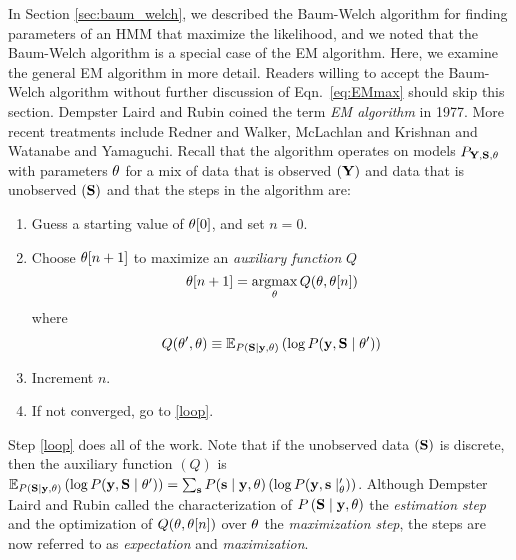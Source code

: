 In Section \ref{sec:baum_welch}, we described the Baum-Welch algorithm
for finding parameters of an HMM that maximize the likelihood, and we
noted that the Baum-Welch algorithm is a special case of the EM
algorithm.  Here, we examine the general EM algorithm in more detail.
Readers willing to accept the Baum-Welch algorithm without further
discussion of Eqn.~\ref{eq:EMmax} should skip this section.  Dempster
Laird and Rubin\cite{Dempster77} coined the term \emph{EM algorithm}
in 1977.  More recent treatments include Redner and
Walker\cite{Redner84}, McLachlan and Krishnan\cite{McLachlan96} and
Watanabe and Yamaguchi\cite{Watanabe04}.  
%
Recall that the algorithm operates on models $P_{{\bf Y},{\bf S},\theta} $
with parameters $\theta$ for a mix of data that is observed
$({\bf Y})$ and data that is unobserved $({\bf S})$ and that the steps in the
algorithm are:
\begin{enumerate}
\item Guess a starting value of ${\theta}{[0]}$, and set $n=0$.
\item \label{loop} Choose ${\theta}{[n+1]}$ to maximize
  an \emph{auxiliary function} $Q$
  \begin{equation}
    \label{eq:EMmax2}
    {\theta}{[n+1]} = \operatorname*{argmax}_{\theta} Q(\theta,
    {\theta}{[n]})
  \end{equation}
  where
  \begin{equation}
    \label{eq:Qdef2}
    Q(\theta',\theta) \equiv \mathbb{E}_{P\left({\bf S}\mid \mathbf{y}, \theta \right)}
    \left( \log P(\mathbf{y},{\bf S}\mid \theta') \right)
  \end{equation}
\item Increment $n$.
\item If not converged, go to \ref{loop}.
\end{enumerate}
Step \ref{loop} does all of the work.  Note that if the unobserved
data $({\bf S})$ is discrete, then the auxiliary function $(Q)$ is
$\mathbb{E}_{P\left({\bf S}\mid \mathbf{y},\theta \right)} \left( \log
  P(\mathbf{y},{\bf S}\mid \theta') \right) = \sum_{\bf s} P({\bf s}\mid \mathbf{y},\theta) \left(
  \log P(\mathbf{y},{\bf s}\mid _\theta') \right)$.  Although Dempster Laird and
Rubin \cite{Dempster77} called the characterization of $P
\left({\bf S}\mid \mathbf{y},\theta \right)$ the \emph{estimation step} and the
optimization of $Q(\theta, {\theta}{[n]})$ over
$\theta$ the \emph{maximization step}, the steps are now referred
to as \emph{expectation} and \emph{maximization}.

